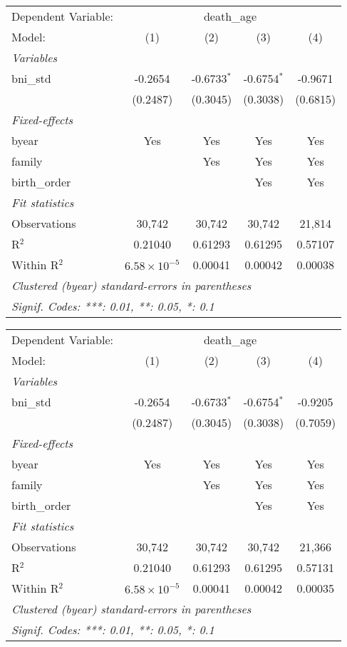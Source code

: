 \begin{tabular}{lcccc}
\tabularnewline\midrule\midrule
Dependent Variable: & \multicolumn{4}{c}{death\_age}\\
Model: & (1) & (2) & (3) & (4)\\
\midrule \emph{Variables} &   &   &   &  \\
bni\_std & -0.2654 & -0.6733$^{*}$ & -0.6754$^{*}$ & -0.9671\\
  & (0.2487) & (0.3045) & (0.3038) & (0.6815)\\
\midrule \emph{Fixed-effects} &   &   &   &  \\
byear & Yes & Yes & Yes & Yes\\
family &  & Yes & Yes & Yes\\
birth\_order &  &  & Yes & Yes\\
\midrule \emph{Fit statistics} &   &   &   &  \\
Observations & 30,742 & 30,742 & 30,742 & 21,814\\
R$^2$ & 0.21040 & 0.61293 & 0.61295 & 0.57107\\
Within R$^2$ & $6.58\times 10^{-5}$ & 0.00041 & 0.00042 & 0.00038\\
\midrule\midrule\multicolumn{5}{l}{\emph{Clustered (byear) standard-errors in parentheses}}\\
\multicolumn{5}{l}{\emph{Signif. Codes: ***: 0.01, **: 0.05, *: 0.1}}\\
\end{tabular}



\begin{tabular}{lcccc}
\tabularnewline\midrule\midrule
Dependent Variable: & \multicolumn{4}{c}{death\_age}\\
Model: & (1) & (2) & (3) & (4)\\
\midrule \emph{Variables} &   &   &   &  \\
bni\_std & -0.2654 & -0.6733$^{*}$ & -0.6754$^{*}$ & -0.9205\\
  & (0.2487) & (0.3045) & (0.3038) & (0.7059)\\
\midrule \emph{Fixed-effects} &   &   &   &  \\
byear & Yes & Yes & Yes & Yes\\
family &  & Yes & Yes & Yes\\
birth\_order &  &  & Yes & Yes\\
\midrule \emph{Fit statistics} &   &   &   &  \\
Observations & 30,742 & 30,742 & 30,742 & 21,366\\
R$^2$ & 0.21040 & 0.61293 & 0.61295 & 0.57131\\
Within R$^2$ & $6.58\times 10^{-5}$ & 0.00041 & 0.00042 & 0.00035\\
\midrule\midrule\multicolumn{5}{l}{\emph{Clustered (byear) standard-errors in parentheses}}\\
\multicolumn{5}{l}{\emph{Signif. Codes: ***: 0.01, **: 0.05, *: 0.1}}\\
\end{tabular}



